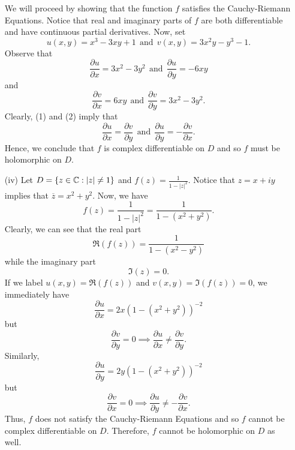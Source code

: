 \documentclass[a4paper]{article}
\begin{document}
\begin{solution}
\begin{enumerate}
        We will proceed by showing that the function \( f  \) satisfies the Cauchy-Riemann Equations. Notice that real and imaginary parts of \( f  \) are both differentiable and have continuous partial derivatives. Now, set 
        \[  u(x,y) = x^{3} - 3xy + 1 \ \ \text{and} \ \ v(x,y) = 3x^{2}y - y^{3} -1. \]
        Observe that 
        \[ \frac{\partial u }{\partial x }  = 3 x^{2} - 3 y^{2} \ \ \text{and} \ \ \frac{\partial u }{\partial y } = - 6xy \tag{1} \] 
       and 
       \[  \frac{\partial v }{\partial x } = 6xy  \ \ \text{and} \ \ \frac{\partial v  }{\partial y }  = 3x^{2} - 3y^{2}. \tag{2} \]
       Clearly, (1) and (2) imply that 
       \[  \frac{\partial u }{\partial x }  = \frac{\partial v }{\partial y } \ \ \text{and} \ \ \frac{\partial u }{\partial y }  = - \frac{\partial v }{\partial x }. \]
       Hence, we conclude that \( f  \) is complex differentiable on \( D  \) and so \( f \) must be holomorphic on \( D  \).
    \item[(iv)] Let \( D = \{ z \in \mathbb{C} : | z  | \neq 1  \}  \) and \( f(z) = \frac{ 1 }{ 1 - | z |^{2} }  \).
        Notice that \( z = x + iy \) implies that \( \overline{z} = x^{2} + y^{2}  \).
        Now, we have 
        \[  f(z) = \frac{ 1 }{ 1 - | z |^{2} }  = \frac{ 1 }{ 1 - (x^{2} + y^{2}) }.  \]
        Clearly, we can see that the real part 
        \[  \Re(f(z)) = \frac{ 1  }{ 1 - (x^{2} - y^{2}) }   \]
        while the imaginary part
        \[  \Im(z) = 0.  \]
        If we label \( u(x,y) = \Re(f(z)) \) and \( v(x,y) = \Im(f(z)) = 0 \), we immediately have
        \[  \frac{\partial u }{\partial x } = 2x (1 - (x^{2} + y^{2}))^{-2} \]
        but
        \[  \frac{\partial v }{\partial y }  = 0 \implies \frac{\partial u }{\partial x }  \neq \frac{\partial v }{\partial y }. \]
        Similarly, 
        \[  \frac{\partial u }{\partial y }  = 2y ( 1 - (x^{2} + y^{2}))^{-2} \]
        but 
        \[  \frac{\partial v }{\partial x } = 0 \implies \frac{\partial u }{\partial y }  \neq - \frac{\partial v }{\partial x }. \]
        Thus, \( f  \) does not satisfy the Cauchy-Riemann Equations and so \( f  \) cannot be complex differentiable on \( D  \). Therefore, \( f  \) cannot be holomorphic on \( D  \) as well.
\end{enumerate} 
\end{solution}
\end{document}
